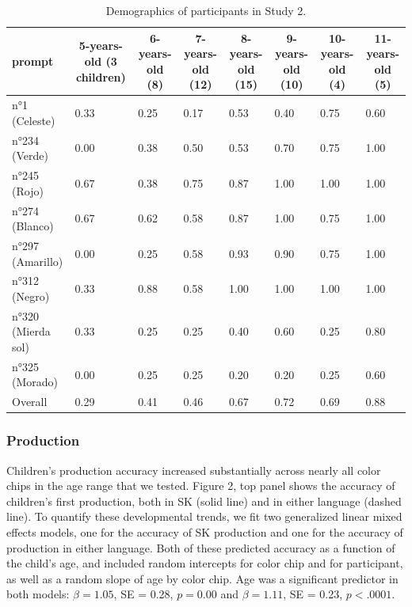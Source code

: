 \documentclass[
  english,
  ,man,floatsintext]{apa6}
\begin{document}
\begin{table}[tbp]

\begin{center}
\begin{threeparttable}

\caption{\label{tab:study2_prodtable}Demographics of participants in Study 2.}

\begin{tabular}{llllllll}
\toprule
prompt & \multicolumn{1}{c}{5-years-old (3 children)} & \multicolumn{1}{c}{6-years-old (8)} & \multicolumn{1}{c}{7-years-old (12)} & \multicolumn{1}{c}{8-years-old (15)} & \multicolumn{1}{c}{9-years-old (10)} & \multicolumn{1}{c}{10-years-old (4)} & \multicolumn{1}{c}{11-years-old (5)}\\
\midrule
n°1 (Celeste) & 0.33 & 0.25 & 0.17 & 0.53 & 0.40 & 0.75 & 0.60\\
n°234 (Verde) & 0.00 & 0.38 & 0.50 & 0.53 & 0.70 & 0.75 & 1.00\\
n°245 (Rojo) & 0.67 & 0.38 & 0.75 & 0.87 & 1.00 & 1.00 & 1.00\\
n°274 (Blanco) & 0.67 & 0.62 & 0.58 & 0.87 & 1.00 & 0.75 & 1.00\\
n°297 (Amarillo) & 0.00 & 0.25 & 0.58 & 0.93 & 0.90 & 0.75 & 1.00\\
n°312 (Negro) & 0.33 & 0.88 & 0.58 & 1.00 & 1.00 & 1.00 & 1.00\\
n°320 (Mierda sol) & 0.33 & 0.25 & 0.25 & 0.40 & 0.60 & 0.25 & 0.80\\
n°325 (Morado) & 0.00 & 0.25 & 0.25 & 0.20 & 0.20 & 0.25 & 0.60\\
Overall & 0.29 & 0.41 & 0.46 & 0.67 & 0.72 & 0.69 & 0.88\\
\bottomrule
\end{tabular}

\end{threeparttable}
\end{center}

\end{table}

\hypertarget{production}{%
\subsubsection{Production}\label{production}}

Children's production accuracy increased substantially across nearly all color chips in the age range that we tested. Figure 2, top panel shows the accuracy of children's first production, both in SK (solid line) and in either language (dashed line). To quantify these developmental trends, we fit two generalized linear mixed effects models, one for the accuracy of SK production and one for the accuracy of production in either language. Both of these predicted accuracy as a function of the child's age, and included random intercepts for color chip and for participant, as well as a random slope of age by color chip. Age was a significant predictor in both models: \(\beta = 1.05\), SE = 0.28, \(p = 0.00\) and \(\beta = 1.11\), SE = 0.23, \(p < .0001\).
\end{document}
